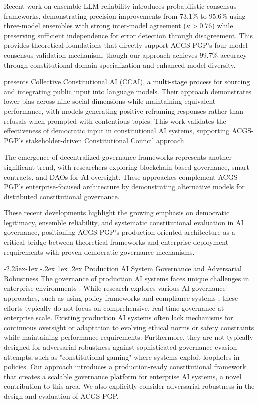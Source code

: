 \documentclass[manuscript,screen,9pt]{acmart}
\makeatletter
\renewcommand\subsection{\@startsection{subsection}{2}{\z@}%
  {-2.25ex\@plus -1ex \@minus -.2ex}%
  {1ex \@plus .2ex}%
  {\normalfont\large\bfseries}}
\makeatother
\begin{document}
Recent work on ensemble LLM reliability \citep{Naik2024ProbabilisticConsensus} introduces probabilistic consensus frameworks, demonstrating precision improvements from 73.1\% to 95.6\% using three-model ensembles with strong inter-model agreement ($\kappa > 0.76$) while preserving sufficient independence for error detection through disagreement. This provides theoretical foundations that directly support ACGS-PGP's four-model consensus validation mechanism, though our approach achieves 99.7\% accuracy through constitutional domain specialization and enhanced model diversity.

\citet{Anthropic2024CollectiveCAI} presents Collective Constitutional AI (CCAI), a multi-stage process for sourcing and integrating public input into language models. Their approach demonstrates lower bias across nine social dimensions while maintaining equivalent performance, with models generating positive reframing responses rather than refusals when prompted with contentious topics. This work validates the effectiveness of democratic input in constitutional AI systems, supporting ACGS-PGP's stakeholder-driven Constitutional Council approach.

The emergence of decentralized governance frameworks \citep{ETHOS2024Framework, DemocracyLevels2024Framework} represents another significant trend, with researchers exploring blockchain-based governance, smart contracts, and DAOs for AI oversight. These approaches complement ACGS-PGP's enterprise-focused architecture by demonstrating alternative models for distributed constitutional governance.

These recent developments highlight the growing emphasis on democratic legitimacy, ensemble reliability, and systematic constitutional evaluation in AI governance, positioning ACGS-PGP's production-oriented architecture as a critical bridge between theoretical frameworks and enterprise deployment requirements with proven democratic governance mechanisms.

\subsection{Production AI System Governance and Adversarial Robustness}
\label{subsec:related_production_governance}
The governance of production AI systems faces unique challenges in enterprise environments \cite{Chauhan2025ECLLMSurvey}. While research explores various AI governance approaches, such as using policy frameworks and compliance systems \cite{Nordin2024LLMGP}, these efforts typically do not focus on comprehensive, real-time governance at enterprise scale. Existing production AI systems often lack mechanisms for continuous oversight or adaptation to evolving ethical norms or safety constraints while maintaining performance requirements. Furthermore, they are not typically designed for adversarial robustness against sophisticated governance evasion attempts, such as "constitutional gaming" where systems exploit loopholes in policies. Our approach introduces a production-ready constitutional framework that creates a scalable governance platform for enterprise AI systems, a novel contribution to this area. We also explicitly consider adversarial robustness in the design and evaluation of ACGS-PGP.
\end{document}
